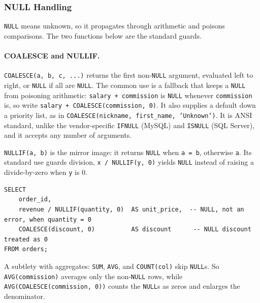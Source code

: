 \subsubsection{NULL Handling}

\texttt{NULL} means unknown, so it propagates through arithmetic and poisons
comparisons. The two functions below are the standard guards.

\paragraph{COALESCE and NULLIF.} \texttt{COALESCE(a, b, c, ...)} returns the
first non-\texttt{NULL} argument, evaluated left to right, or \texttt{NULL} if
all are \texttt{NULL}. The common use is a fallback that keeps a \texttt{NULL}
from poisoning arithmetic: \texttt{salary + commission} is \texttt{NULL}
whenever \texttt{commission} is, so write \texttt{salary + COALESCE(commission, 0)}.
It also supplies a default down a priority list, as in
\texttt{COALESCE(nickname, first\_name, 'Unknown')}. It is ANSI standard,
unlike the vendor-specific \texttt{IFNULL} (MySQL) and \texttt{ISNULL}
(SQL Server), and it accepts any number of arguments.

\texttt{NULLIF(a, b)} is the mirror image: it returns \texttt{NULL} when
\texttt{a = b}, otherwise \texttt{a}. Its standard use guards division,
\texttt{x / NULLIF(y, 0)} yields \texttt{NULL} instead of raising a
divide-by-zero when \texttt{y} is 0.

\begin{lstlisting}[style=sql, caption={NULLIF guards division, COALESCE supplies defaults}]
SELECT
    order_id,
    revenue / NULLIF(quantity, 0)  AS unit_price,  -- NULL, not an error, when quantity = 0
    COALESCE(discount, 0)          AS discount      -- NULL discount treated as 0
FROM orders;
\end{lstlisting}

\vspace{-1ex}

A subtlety with aggregates: \texttt{SUM}, \texttt{AVG}, and
\texttt{COUNT(col)} skip \texttt{NULL}s. So \texttt{AVG(commission)} averages
only the non-\texttt{NULL} rows, while \texttt{AVG(COALESCE(commission, 0))}
counts the \texttt{NULL}s as zeros and enlarges the denominator. 

